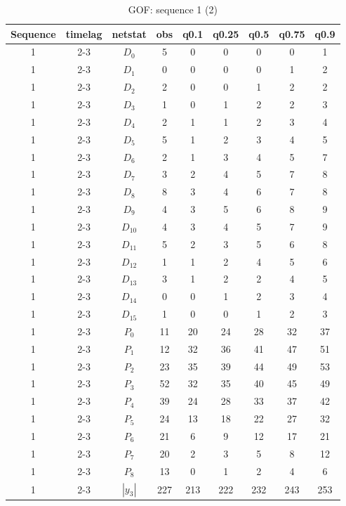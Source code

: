\documentclass[a4paper, 11pt]{report}
\theoremstyle{definition}
\begin{document}
\clearpage
\begin{table}[h!]
    \centering
        \begin{tabular}{c| c | c | c | c |c |c |c |c }
            Sequence& timelag & netstat & obs & q0.1 & q0.25 & q0.5 & q0.75 & q0.9 \\
            \hline \hline
            1 & 2-3 & $D_0$ & 5 &  0& 0& 0& 0& 1 \\
            1 & 2-3 & $D_1$ & 0 &  0& 0& 0& 1& 2 \\
            1 & 2-3 & $D_2$ & 2 &  0& 0& 1& 2& 2 \\
            1 & 2-3 & $D_3$ & 1 &  0& 1& 2& 2& 3 \\
            1 & 2-3 & $D_4$ & 2 &  1& 1& 2& 3& 4 \\
            1 & 2-3 & $D_5$ & 5 &  1& 2& 3& 4& 5 \\
            1 & 2-3 & $D_6$ & 2 &  1& 3& 4& 5& 7 \\
            1 & 2-3 & $D_7$ & 3 &  2& 4& 5& 7& 8 \\
            1 & 2-3 & $D_8$ & 8 &  3& 4& 6& 7& 8 \\
            1 & 2-3 & $D_9$ & 4 &  3& 5& 6& 8& 9 \\
            1 & 2-3 & $D_{10}$ & 4 &  3& 4& 5& 7& 9 \\
            1 & 2-3 & $D_{11}$ & 5 &  2& 3& 5& 6& 8 \\
            1 & 2-3 & $D_{12}$ & 1 &  1& 2& 4& 5& 6 \\
            1 & 2-3 & $D_{13}$ & 3 &  1& 2& 2& 4& 5 \\
            1 & 2-3 & $D_{14}$ & 0 &  0& 1& 2& 3& 4 \\
            1 & 2-3 & $D_{15}$ & 1 &  0& 0& 1& 2& 3 \\
            1 & 2-3 & $P_0$ & 11 & 20& 24& 28& 32& 37 \\
            1 & 2-3 & $P_1$ & 12 & 32& 36& 41& 47& 51 \\
            1 & 2-3 & $P_2$ & 23 & 35& 39& 44& 49& 53 \\
            1 & 2-3 & $P_3$ & 52 & 32& 35& 40& 45& 49 \\
            1 & 2-3 & $P_4$ & 39 & 24& 28& 33& 37& 42 \\
            1 & 2-3 & $P_5$ & 24 & 13& 18& 22& 27& 32 \\
            1 & 2-3 & $P_6$ & 21 &  6& 9& 12& 17& 21 \\
            1 & 2-3 & $P_7$ & 20 &  2& 3& 5& 8& 12 \\
            1 & 2-3 & $P_8$ & 13 &  0& 1& 2& 4& 6 \\
            1 & 2-3 & $|y_3|$ & 227 &  213& 222& 232& 243& 253 \\
        \end{tabular}
        \caption{GOF: sequence 1 (2)}
    \end{table}
\clearpage
\end{document}
